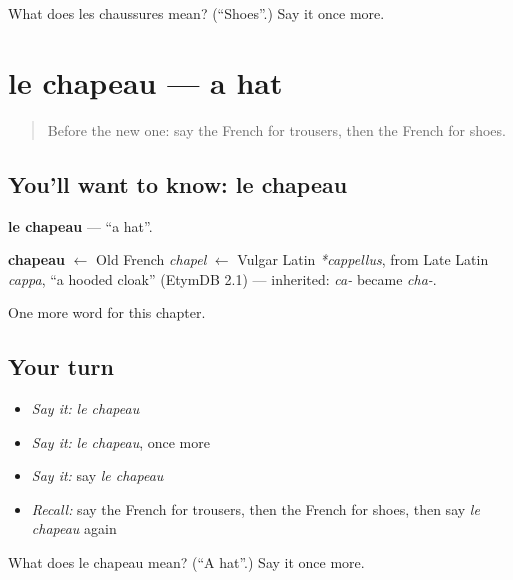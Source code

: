 \begin{tcolorbox}[breakable,colback=teal!4,colframe=teal!35!black,title={Before you move on}]
What does les chaussures mean? (\textquotedblleft{}Shoes\textquotedblright{}.) Say it once more.
\end{tcolorbox}
\section[le chapeau]{le chapeau — a hat}

\label{lesson:FR-C104-chapeau}



\begin{quote}
Before the new one: say the French for trousers, then the French for shoes.
\end{quote}

\subsection*{You'll want to know: le chapeau}
\textbf{le chapeau} — \textquotedblleft{}a hat\textquotedblright{}.

\begin{cousinweb}
\textbf{chapeau} $\leftarrow$ Old French \emph{chapel} $\leftarrow$ Vulgar Latin \emph{*cappellus}, from Late Latin \emph{cappa}, \textquotedblleft{}a hooded cloak\textquotedblright{} (EtymDB 2.1) — inherited: \emph{ca-} became \emph{cha-}.
\end{cousinweb}

\begin{grammarlens}[title={What you've built}]
One more word for this chapter.
\end{grammarlens}

\subsection*{Your turn}
\begin{itemize}
\raggedright
  \item \emph{Say it:} \emph{le chapeau}
  \item \emph{Say it:} \emph{le chapeau}, once more
  \item \emph{Say it:} say \emph{le chapeau}
  \item \emph{Recall:} say the French for trousers, then the French for shoes, then say \emph{le chapeau} again
\end{itemize}

\begin{tcolorbox}[breakable,colback=teal!4,colframe=teal!35!black,title={Before you move on}]
What does le chapeau mean? (\textquotedblleft{}A hat\textquotedblright{}.) Say it once more.
\end{tcolorbox}
